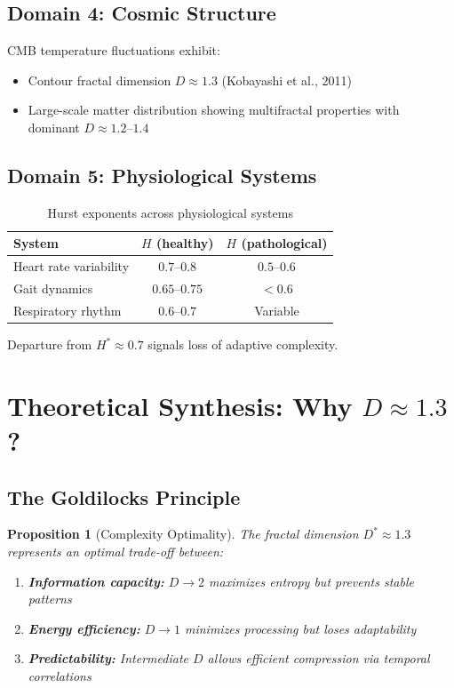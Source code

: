 \documentclass[11pt,a4paper]{article}
\newtheorem{proposition}{Proposition}
\begin{document}
\subsection{Domain 4: Cosmic Structure}

CMB temperature fluctuations exhibit:
\begin{itemize}
    \item Contour fractal dimension $D \approx 1.3$ (Kobayashi et al., 2011)
    \item Large-scale matter distribution showing multifractal properties with dominant $D \approx 1.2$--$1.4$
\end{itemize}

\subsection{Domain 5: Physiological Systems}

\begin{table}[H]
\centering
\caption{Hurst exponents across physiological systems}
\begin{tabular}{lcc}
\toprule
\textbf{System} & \textbf{$H$ (healthy)} & \textbf{$H$ (pathological)} \\
\midrule
Heart rate variability & $0.7$--$0.8$ & $0.5$--$0.6$ \\
Gait dynamics & $0.65$--$0.75$ & $< 0.6$ \\
Respiratory rhythm & $0.6$--$0.7$ & Variable \\
\bottomrule
\end{tabular}
\end{table}

Departure from $H^* \approx 0.7$ signals loss of adaptive complexity.

\section{Theoretical Synthesis: Why $D \approx 1.3$?}

\subsection{The Goldilocks Principle}

\begin{proposition}[Complexity Optimality]
The fractal dimension $D^* \approx 1.3$ represents an optimal trade-off between:
\begin{enumerate}
    \item \textbf{Information capacity:} $D \to 2$ maximizes entropy but prevents stable patterns
    \item \textbf{Energy efficiency:} $D \to 1$ minimizes processing but loses adaptability
    \item \textbf{Predictability:} Intermediate $D$ allows efficient compression via temporal correlations
\end{enumerate}
\end{proposition}
\end{document}
